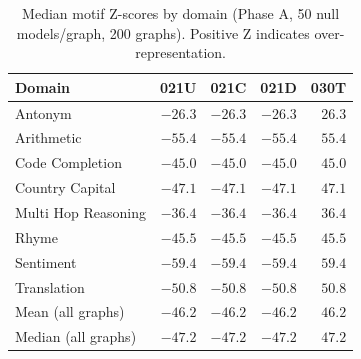 \begin{table}[t]
\centering
\caption{Median motif Z-scores by domain (Phase A, 50 null models/graph, 200 graphs). Positive Z indicates over-representation.}
\label{table:zscores}
\begin{tabular}{lrrrr}
\toprule
Domain & 021U & 021C & 021D & 030T \\
\midrule
    Antonym                   & $  -26.3$ & $  -26.3$ & $  -26.3$ & $   26.3$ \\
    Arithmetic                & $  -55.4$ & $  -55.4$ & $  -55.4$ & $   55.4$ \\
    Code Completion           & $  -45.0$ & $  -45.0$ & $  -45.0$ & $   45.0$ \\
    Country Capital           & $  -47.1$ & $  -47.1$ & $  -47.1$ & $   47.1$ \\
    Multi Hop Reasoning       & $  -36.4$ & $  -36.4$ & $  -36.4$ & $   36.4$ \\
    Rhyme                     & $  -45.5$ & $  -45.5$ & $  -45.5$ & $   45.5$ \\
    Sentiment                 & $  -59.4$ & $  -59.4$ & $  -59.4$ & $   59.4$ \\
    Translation               & $  -50.8$ & $  -50.8$ & $  -50.8$ & $   50.8$ \\
\midrule
    Mean (all graphs)         & $  -46.2$ & $  -46.2$ & $  -46.2$ & $   46.2$ \\
    Median (all graphs)       & $  -47.2$ & $  -47.2$ & $  -47.2$ & $   47.2$ \\
\bottomrule
\end{tabular}
\end{table}